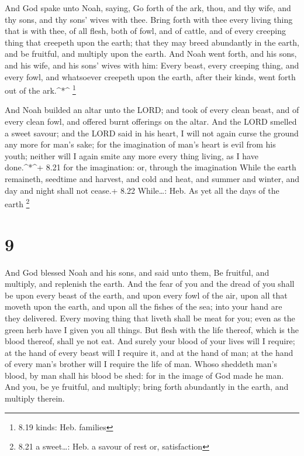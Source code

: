  And God spake unto Noah, saying,  Go forth of
the ark, thou, and thy wife, and thy sons, and thy sons' wives with
thee.  Bring forth with thee every living thing that is
with thee, of all flesh, both of fowl, and of cattle, and of every
creeping thing that creepeth upon the earth; that they may breed
abundantly in the earth, and be fruitful, and multiply upon the earth.
 And Noah went forth, and his sons, and his wife, and his
sons' wives with him:  Every beast, every creeping thing,
and every fowl, and whatsoever creepeth upon the earth, after their
kinds, went forth out of the ark.\^{}*\^{} \footnote{8.19 kinds: Heb.
  families}

 And Noah builded an altar unto the LORD; and took of every
clean beast, and of every clean fowl, and offered burnt offerings on the
altar.  And the LORD smelled a sweet savour; and the LORD
said in his heart, I will not again curse the ground any more for man's
sake; for the imagination of man's heart is evil from his youth; neither
will I again smite any more every thing living, as I have
done.\^{}*\^{}+ 8.21 for the imagination: or, through the imagination
 While the earth remaineth, seedtime and harvest, and cold
and heat, and summer and winter, and day and night shall not cease.+
8.22 While\ldots: Heb. As yet all the days of the earth \footnote{8.21 a
  sweet\ldots: Heb. a savour of rest or, satisfaction}

\hypertarget{section-8}{%
\section{9}\label{section-8}}

 And God blessed Noah and his sons, and said unto them, Be
fruitful, and multiply, and replenish the earth.  And the
fear of you and the dread of you shall be upon every beast of the earth,
and upon every fowl of the air, upon all that moveth upon the earth, and
upon all the fishes of the sea; into your hand are they delivered.
 Every moving thing that liveth shall be meat for you; even
as the green herb have I given you all things.  But flesh
with the life thereof, which is the blood thereof, shall ye not eat.
 And surely your blood of your lives will I require; at the
hand of every beast will I require it, and at the hand of man; at the
hand of every man's brother will I require the life of man. 
Whoso sheddeth man's blood, by man shall his blood be shed: for in the
image of God made he man.  And you, be ye fruitful, and
multiply; bring forth abundantly in the earth, and multiply therein.

